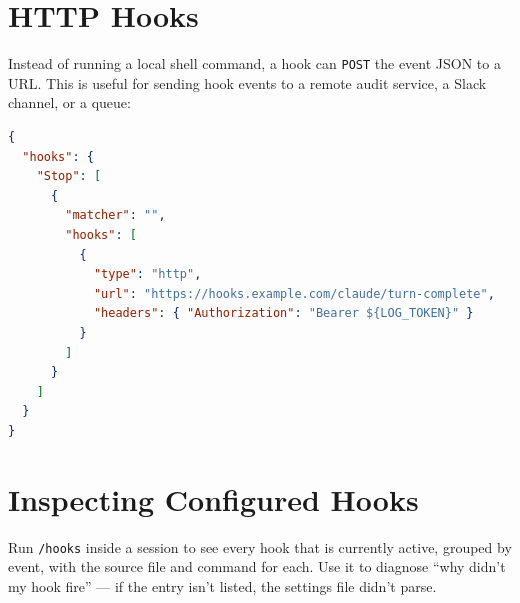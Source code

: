 \section{HTTP Hooks}
\label{sec:http-hooks}


Instead of running a local shell command, a hook can \texttt{POST} the event
JSON to a URL. This is useful for sending hook events to a remote audit
service, a Slack channel, or a queue:

\begin{lstlisting}[language=json,caption={An HTTP hook}]
{
  "hooks": {
    "Stop": [
      {
        "matcher": "",
        "hooks": [
          {
            "type": "http",
            "url": "https://hooks.example.com/claude/turn-complete",
            "headers": { "Authorization": "Bearer ${LOG_TOKEN}" }
          }
        ]
      }
    ]
  }
}
\end{lstlisting}

\section{Inspecting Configured Hooks}

Run \texttt{/hooks} inside a session to see every hook that is currently
active, grouped by event, with the source file and command for each. Use it
to diagnose ``why didn't my hook fire'' — if the entry isn't listed, the
settings file didn't parse.

